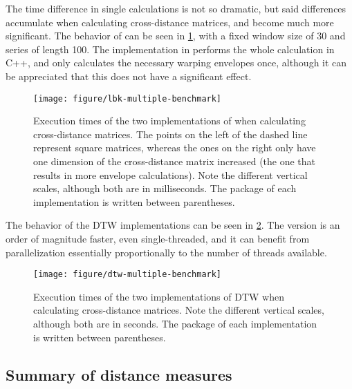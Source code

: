 The time difference in single calculations is not so dramatic,
but said differences accumulate when calculating cross-distance matrices,
and become much more significant.
The behavior of  can be seen in \cref{fig:lbk-multiple-benchmark},
with a fixed window size of 30 and series of length 100.
The implementation in \dtwclust{} performs the whole calculation in C++,
and only calculates the necessary warping envelopes once,
although it can be appreciated that this does not have a significant effect.

\begin{figure}[htbp]
	
	{\centering \texttt{[image: figure/lbk-multiple-benchmark]}		
	}
	
	\caption{Execution times of the  two implementations of  when calculating cross-distance matrices. The points on the left of the dashed line represent square matrices, whereas the ones on the right only have one dimension of the cross-distance matrix increased (the one that results in more envelope calculations). Note the different vertical scales, although both are in milliseconds. The package of each implementation is written between parentheses.}\label{fig:lbk-multiple-benchmark}
\end{figure}

The behavior of the DTW implementations can be seen in \cref{fig:dtw-multiple-benchmark}.
The \dtwclust{} version is an order of magnitude faster,
even single-threaded,
and it can benefit from parallelization essentially proportionally to the number of threads available.

\begin{figure}[htbp]
	
	{\centering \texttt{[image: figure/dtw-multiple-benchmark]}
		
	}
	
	\caption{Execution times of the  two implementations of DTW when calculating cross-distance matrices. Note the different vertical scales, although both are in seconds. The package of each implementation is written between parentheses.}\label{fig:dtw-multiple-benchmark}
\end{figure}

\subsection{Summary of distance measures}
\label{sec:distances-summary}

